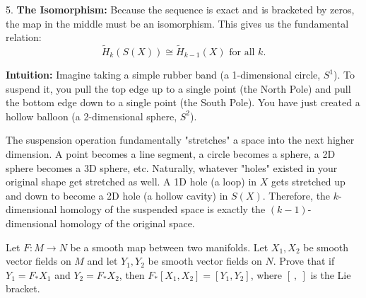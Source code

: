 \begin{solution}
5. \textbf{The Isomorphism:}
Because the sequence is exact and is bracketed by zeros, the map in the middle must be an isomorphism. This gives us the fundamental relation:
\[ \tilde{H}_k(S(X)) \cong \tilde{H}_{k-1}(X) \text{ for all } k. \]
\par\vspace{\baselineskip}

\textbf{Intuition:}
Imagine taking a simple rubber band (a 1-dimensional circle, $S^1$). To suspend it, you pull the top edge up to a single point (the North Pole) and pull the bottom edge down to a single point (the South Pole). You have just created a hollow balloon (a 2-dimensional sphere, $S^2$).
\par\vspace{\baselineskip}

The suspension operation fundamentally "stretches" a space into the next higher dimension. A point becomes a line segment, a circle becomes a sphere, a 2D sphere becomes a 3D sphere, etc. Naturally, whatever "holes" existed in your original shape get stretched as well. A 1D hole (a loop) in $X$ gets stretched up and down to become a 2D hole (a hollow cavity) in $S(X)$. Therefore, the $k$-dimensional homology of the suspended space is exactly the $(k-1)$-dimensional homology of the original space.
\end{solution}

\begin{exercise}
\label{geometry:2015:9}
Let $F : M \to N$ be a smooth map between two manifolds. Let $X_{1}, X_{2}$ be smooth vector fields on $M$ and let $Y_{1}, Y_{2}$ be smooth vector fields on $N$. Prove that if $Y_{1} = F_{*}X_{1}$ and $Y_{2} = F_{*}X_{2}$, then $F_{*}[X_{1}, X_{2}] = [Y_{1}, Y_{2}]$, where $[~, ~]$ is the Lie bracket.
\end{exercise}

